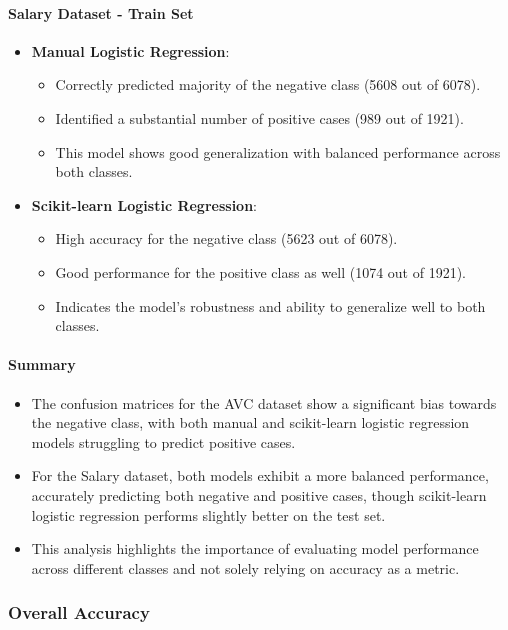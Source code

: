 \documentclass[a4paper,12pt]{article}
\begin{document}
\paragraph{Salary Dataset - Train Set}
\begin{itemize}
    \item \textbf{Manual Logistic Regression}:
    \begin{itemize}
        \item Correctly predicted majority of the negative class (5608 out of 6078).
        \item Identified a substantial number of positive cases (989 out of 1921).
        \item This model shows good generalization with balanced performance across both classes.
    \end{itemize}
    \item \textbf{Scikit-learn Logistic Regression}:
    \begin{itemize}
        \item High accuracy for the negative class (5623 out of 6078).
        \item Good performance for the positive class as well (1074 out of 1921).
        \item Indicates the model's robustness and ability to generalize well to both classes.
    \end{itemize}
\end{itemize}

\paragraph{Summary}
\begin{itemize}
    \item The confusion matrices for the AVC dataset show a significant bias towards the negative class, with both manual and scikit-learn logistic regression models struggling to predict positive cases.
    \item For the Salary dataset, both models exhibit a more balanced performance, accurately predicting both negative and positive cases, though scikit-learn logistic regression performs slightly better on the test set.
    \item This analysis highlights the importance of evaluating model performance across different classes and not solely relying on accuracy as a metric.
\end{itemize}

\subsubsection{Overall Accuracy}
\end{document}
